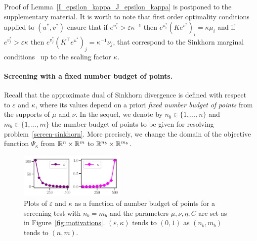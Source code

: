 Proof of Lemma~\ref{I_epsilon_kappa_J_epsilon_kappa} is postponed to the supplementary material. It is worth to note that first order optimality conditions applied to $(u^{*}, v^{*})$ ensure that if $e^{u^{*}_i} > \varepsilon\kappa^{-1}$ then $e^{u^{*}_i} (Ke^{v^{*}})_i =  \kappa\mu_i$ and if $e^{v^{*}_j} > \varepsilon\kappa$ then $e^{v^{*}_j} (K^\top e^{u^{*}})_j =  \kappa^{-1}\nu_j$, that correspond to the Sinkhorn marginal conditions~\citep{peyre2019COTnowpublisher} up to the scaling factor $\kappa$. 

\paragraph{Screening with a fixed number budget of points.}

Recall that the approximate dual of Sinkhorn divergence is defined with respect to $\varepsilon$ and $\kappa$, where its values depend on a priori \emph{fixed number budget of points} from the supports of $\mu$ and $\nu$.
In the sequel, we denote by $n_b \in\{1, \ldots, n\}$ and $m_b\in\{1, \ldots, m\}$ the number budget of points to be given for resolving problem~\eqref{screen-sinkhorn}. More precisely, we change the domain of the objective function $\Psi_\kappa$ from ${\mathbb{R}}^n \times {\mathbb{R}}^m$ to ${\mathbb{R}}^{n_b} \times {\mathbb{R}}^{m_b}$.

\begin{figure}
\vspace{-18pt}
\centering
\includegraphics[width=0.46\textwidth]{./figs/kappa_epsilon.pdf}
\caption{Plots of $\varepsilon$ and $\kappa$ as a function of number budget of points for a screening test with $n_b=m_b$ and the parameters $\mu, \nu, \eta, C$ are set as in Figure~\eqref{fig:motivations}.  $(\varepsilon, \kappa)$ tends to $(0,1)$ as $(n_b,m_b)$ tends to $(n,m)$.}
\label{fig:kappa_epsilon}
\vspace{-15pt}
\end{figure}

